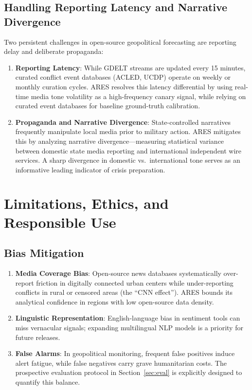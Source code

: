 \documentclass[preprint,12pt]{elsarticle}
\begin{document}
\subsection{Handling Reporting Latency and Narrative Divergence}
Two persistent challenges in open-source geopolitical forecasting are reporting delay and deliberate propaganda:
\begin{enumerate}
    \item \textbf{Reporting Latency}: While GDELT streams are updated every 15 minutes, curated conflict event databases (ACLED, UCDP) operate on weekly or monthly curation cycles. ARES resolves this latency differential by using real-time media tone volatility as a high-frequency canary signal, while relying on curated event databases for baseline ground-truth calibration.
    \item \textbf{Propaganda and Narrative Divergence}: State-controlled narratives frequently manipulate local media prior to military action. ARES mitigates this by analyzing narrative divergence---measuring statistical variance between domestic state media reporting and international independent wire services. A sharp divergence in domestic vs.\ international tone serves as an informative leading indicator of crisis preparation.
\end{enumerate}

\section{Limitations, Ethics, and Responsible Use}
\label{sec:ethics}

\subsection{Bias Mitigation}
\begin{enumerate}
    \item \textbf{Media Coverage Bias}: Open-source news databases systematically over-report friction in digitally connected urban centers while under-reporting conflicts in rural or censored areas (the ``CNN effect''). ARES bounds its analytical confidence in regions with low open-source data density.
    \item \textbf{Linguistic Representation}: English-language bias in sentiment tools can miss vernacular signals; expanding multilingual NLP models is a priority for future releases.
    \item \textbf{False Alarms}: In geopolitical monitoring, frequent false positives induce alert fatigue, while false negatives carry grave humanitarian costs. The prospective evaluation protocol in Section~\ref{sec:eval} is explicitly designed to quantify this balance.
\end{enumerate}
\end{document}
